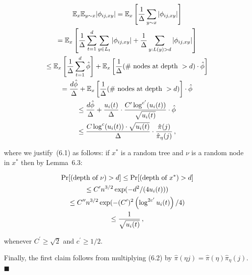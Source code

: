 \[\begin{gathered}
\displaystyle\mathbb{E}_{x}\mathbb{E}_{y\sim x}|\phi_{ij,xy}| \displaystyle=\mathbb{E}_{x}\left[\frac{1}{\Delta}\sum_{y\sim x}|\phi_{ij,xy}|\right] \\
\displaystyle=\mathbb{E}_{x}\left[\frac{1}{\Delta}\sum_{t=1}^{d}\sum_{y\in L_{t}}|\phi_{ij,xy}|+\frac{1}{\Delta}\sum_{y:L(y)>d}|\phi_{ij,xy}|\right] \\
\displaystyle\leq\mathbb{E}_{x}\left[\frac{1}{\Delta}\sum_{t=1}^{d}\hat{\phi}\right]+\mathbb{E}_{x}\left[\frac{1}{\Delta}(\textnormal{\# nodes at depth }>d)\cdot\hat{\phi}\right] \\
\displaystyle=\frac{d\hat{\phi}}{\Delta}+\mathbb{E}_{x}\left[\frac{1}{\Delta}(\textnormal{\# nodes at depth }>d)\right]\cdot\hat{\phi} \\
\displaystyle\leq\frac{d\hat{\phi}}{\Delta}+\frac{u_{i}(t)}{\Delta}\cdot\frac{C^{\prime}\log^{c^{\prime}}(u_{i}(t))}{\sqrt{u_{i}(t)}}\cdot\hat{\phi} \\
\displaystyle\leq\frac{C\log^{c}(u_{i}(t))\cdot\sqrt{u_{i}(t)}}{\Delta}\cdot\frac{\hat{\pi}(j)}{\hat{\pi}_{\eta}(j)}\,,
\end{gathered}\]




where we justify (6.1) as follows: if $x^{*}$ is a random tree and $\nu$ is a random node in $x^{*}$ then by Lemma 6.3:\par


\[\begin{gathered}
\displaystyle\Pr[(\textnormal{depth of }\nu)>d] \displaystyle\leq\Pr[(\textnormal{depth of }x^{*})>d] \\
\displaystyle\leq C^{\prime}n^{3/2}\exp(-d^{2}/(4u_{i}(t))) \\
\displaystyle\leq C^{\prime\prime}n^{3/2}\exp(-(C^{\prime})^{2}\left(\log^{2c^{\prime}}u_{i}(t)\right)/4) \\
\displaystyle\leq\frac{1}{\sqrt{u_{i}(t)}}\,,
\end{gathered}\]


whenever $C^{\prime}\geq\sqrt{2}$ and $c^{\prime}\geq 1/2$.\par




Finally, the first claim follows from multiplying (6.2) by $\hat{\pi}(\eta j)=\hat{\pi}(\eta)\hat{\pi}_{\eta}(j)$.
\ensuremath{\blacksquare}\par







